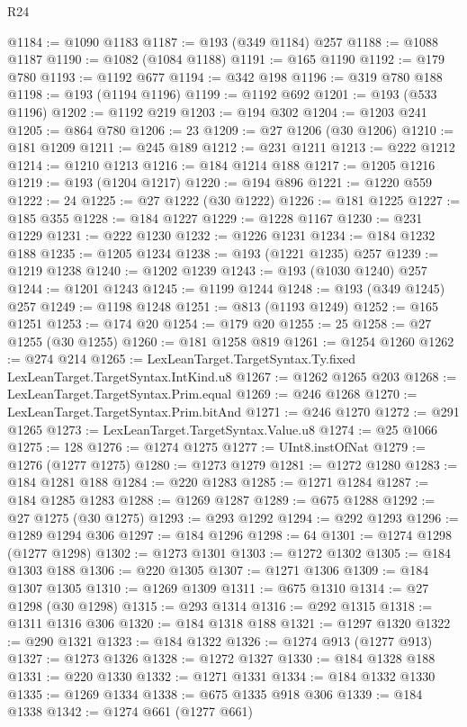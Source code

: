 \begin{lexlean}{R24}
\begin{coremodule}
@1184 := @1090 @1183
@1187 := @193 (@349 @1184) @257
@1188 := @1088 @1187
@1190 := @1082 (@1084 @1188)
@1191 := @165 @1190
@1192 := @179 @780
@1193 := @1192 @677
@1194 := @342 @198
@1196 := @319 @780 @188
@1198 := @193 (@1194 @1196)
@1199 := @1192 @692
@1201 := @193 (@533 @1196)
@1202 := @1192 @219
@1203 := @194 @302
@1204 := @1203 @241
@1205 := @864 @780
@1206 := 23
@1209 := @27 @1206 (@30 @1206)
@1210 := @181 @1209
@1211 := @245 @189
@1212 := @231 @1211
@1213 := @222 @1212
@1214 := @1210 @1213
@1216 := @184 @1214 @188
@1217 := @1205 @1216
@1219 := @193 (@1204 @1217)
@1220 := @194 @896
@1221 := @1220 @559
@1222 := 24
@1225 := @27 @1222 (@30 @1222)
@1226 := @181 @1225
@1227 := @185 @355
@1228 := @184 @1227
@1229 := @1228 @1167
@1230 := @231 @1229
@1231 := @222 @1230
@1232 := @1226 @1231
@1234 := @184 @1232 @188
@1235 := @1205 @1234
@1238 := @193 (@1221 @1235) @257
@1239 := @1219 @1238
@1240 := @1202 @1239
@1243 := @193 (@1030 @1240) @257
@1244 := @1201 @1243
@1245 := @1199 @1244
@1248 := @193 (@349 @1245) @257
@1249 := @1198 @1248
@1251 := @813 (@1193 @1249)
@1252 := @165 @1251
@1253 := @174 @20
@1254 := @179 @20
@1255 := 25
@1258 := @27 @1255 (@30 @1255)
@1260 := @181 @1258 @819
@1261 := @1254 @1260
@1262 := @274 @214
@1265 := LexLeanTarget.TargetSyntax.Ty.fixed LexLeanTarget.TargetSyntax.IntKind.u8
@1267 := @1262 @1265 @203
@1268 := LexLeanTarget.TargetSyntax.Prim.equal
@1269 := @246 @1268
@1270 := LexLeanTarget.TargetSyntax.Prim.bitAnd
@1271 := @246 @1270
@1272 := @291 @1265
@1273 := LexLeanTarget.TargetSyntax.Value.u8
@1274 := @25 @1066
@1275 := 128
@1276 := @1274 @1275
@1277 := UInt8.instOfNat
@1279 := @1276 (@1277 @1275)
@1280 := @1273 @1279
@1281 := @1272 @1280
@1283 := @184 @1281 @188
@1284 := @220 @1283
@1285 := @1271 @1284
@1287 := @184 @1285 @1283
@1288 := @1269 @1287
@1289 := @675 @1288
@1292 := @27 @1275 (@30 @1275)
@1293 := @293 @1292
@1294 := @292 @1293
@1296 := @1289 @1294 @306
@1297 := @184 @1296
@1298 := 64
@1301 := @1274 @1298 (@1277 @1298)
@1302 := @1273 @1301
@1303 := @1272 @1302
@1305 := @184 @1303 @188
@1306 := @220 @1305
@1307 := @1271 @1306
@1309 := @184 @1307 @1305
@1310 := @1269 @1309
@1311 := @675 @1310
@1314 := @27 @1298 (@30 @1298)
@1315 := @293 @1314
@1316 := @292 @1315
@1318 := @1311 @1316 @306
@1320 := @184 @1318 @188
@1321 := @1297 @1320
@1322 := @290 @1321
@1323 := @184 @1322
@1326 := @1274 @913 (@1277 @913)
@1327 := @1273 @1326
@1328 := @1272 @1327
@1330 := @184 @1328 @188
@1331 := @220 @1330
@1332 := @1271 @1331
@1334 := @184 @1332 @1330
@1335 := @1269 @1334
@1338 := @675 @1335 @918 @306
@1339 := @184 @1338
@1342 := @1274 @661 (@1277 @661)

\end{coremodule}
\end{lexlean}
